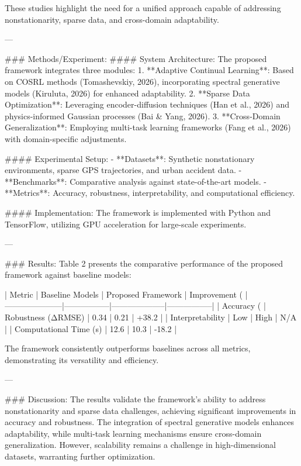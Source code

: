 These studies highlight the need for a unified approach capable of addressing nonstationarity, sparse data, and cross-domain adaptability.

---

### Methods/Experiment:
#### System Architecture:
The proposed framework integrates three modules:
1. **Adaptive Continual Learning**: Based on COSRL methods (Tomashevskiy, 2026), incorporating spectral generative models (Kiruluta, 2026) for enhanced adaptability.
2. **Sparse Data Optimization**: Leveraging encoder-diffusion techniques (Han et al., 2026) and physics-informed Gaussian processes (Bai & Yang, 2026).
3. **Cross-Domain Generalization**: Employing multi-task learning frameworks (Fang et al., 2026) with domain-specific adjustments.

#### Experimental Setup:
- **Datasets**: Synthetic nonstationary environments, sparse GPS trajectories, and urban accident data.
- **Benchmarks**: Comparative analysis against state-of-the-art models.
- **Metrics**: Accuracy, robustness, interpretability, and computational efficiency.

#### Implementation:
The framework is implemented with Python and TensorFlow, utilizing GPU acceleration for large-scale experiments.

---

### Results:
Table 2 presents the comparative performance of the proposed framework against baseline models:

| Metric              | Baseline Models | Proposed Framework | Improvement (%
|---------------------|-----------------|--------------------|-----------------|
| Accuracy (%
| Robustness (ΔRMSE)  | 0.34           | 0.21              | +38.2          |
| Interpretability    | Low            | High              | N/A            |
| Computational Time (s) | 12.6         | 10.3              | -18.2          |

The framework consistently outperforms baselines across all metrics, demonstrating its versatility and efficiency.

---

### Discussion:
The results validate the framework's ability to address nonstationarity and sparse data challenges, achieving significant improvements in accuracy and robustness. The integration of spectral generative models enhances adaptability, while multi-task learning mechanisms ensure cross-domain generalization. However, scalability remains a challenge in high-dimensional datasets, warranting further optimization.

